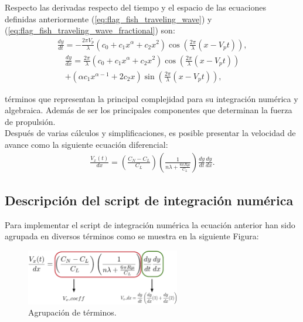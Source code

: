 Respecto las derivadas respecto del tiempo y el espacio de las ecuaciones definidas anteriormente (\ref{eq:flag_fish_traveling_wave}) y (\ref{eq:flag_fish_traveling_wave_fractional}) son:
\begin{eqnarray}
	\label{eq:dy_dt}
	\frac{dy}{dt} = - \frac{2 \pi V_p}{\lambda}  (c_0 + c_1 x^{\alpha} + c_2 x^2) \cos \left( \frac{2 \pi}{\lambda}  ( x - V_p t) \right), 
\end{eqnarray}
\begin{eqnarray}
	\label{eq:dy_dx}
		\frac{dy}{dx} = \frac{2 \pi }{\lambda}  (c_0 + c_1 x^{\alpha} + c_2 x^2) \cos \left( \frac{2 \pi}{\lambda}  ( x - V_p t) \right)\\
		 + (\alpha c_1 x^{\alpha-1} + 2 c_2 x) \sin \left(  \frac{2 \pi}{\lambda}  ( x - V_p t) \right), \nonumber
\end{eqnarray}

términos que representan la principal complejidad para su integración numérica y algebraica. Además de ser los principales componentes que determinan la fuerza de propulsión.\\

Después de varias cálculos y simplificaciones, es posible presentar la velocidad de avance como la siguiente ecuación diferencial:
\begin{eqnarray}
\label{eq:Vx_dx}
	\frac{V_x (t)}{dx} =  \left( \frac{C_N - C_L}{C_L} \right) \left( \frac{1}{ n \lambda + \frac{6 \pi R \mu}{C_L} }  \right) \frac{dy}{dt} \frac{dy}{dx}.
	\end{eqnarray}

\subsection{Descripción del script de integración numérica} \label{sec:descripcion_script}
Para implementar el script de integración numérica la ecuación anterior han sido agrupada en diversos términos como se muestra en la siguiente Figura:
\begin{figure}[!h] %
	\vspace*{3mm}
    \centering
    \includegraphics[width=0.6\textwidth]{Figuras/FDF}
  	\caption{Agrupación de términos.}
  	\label{fig:OVF}
\end{figure}


